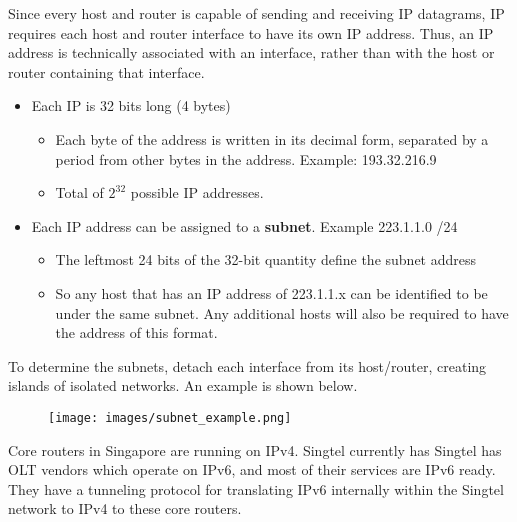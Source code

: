 \documentclass[a4paper]{article}
\begin{document}
\noindent Since every host and router is capable of sending and receiving IP datagrams, IP requires each host and router interface to have its own IP address. Thus, an IP address is technically associated with an interface, rather than with the host or router containing that interface.
\begin{itemize}
    \item Each IP is 32 bits long (4 bytes)
    \begin{itemize}[label=$\circ$]
        \item Each byte of the address is written in its decimal form, separated by a period from other bytes in the address. Example: 193.32.216.9
        \item Total of $2^{32}$ possible IP addresses.
    \end{itemize}
    \item Each IP address can be assigned to a \textbf{subnet}. Example 223.1.1.0 /24
    \begin{itemize}[label=$\circ$]
        \item The leftmost 24 bits of the 32-bit quantity define the subnet address
        \item So any host that has an IP address of 223.1.1.x can be identified to be under the same subnet. Any additional hosts will also be required to have the address of this format.
    \end{itemize}
\end{itemize}
To determine the subnets, detach each interface from its host/router, creating islands of isolated networks. An example is shown below.
\begin{figure}[H]
    \centering
    \texttt{[image: images/subnet\_example.png]}
\end{figure}
\begin{framed}
    \begin{displayquote}
        Core routers in Singapore are running on IPv4. Singtel currently has Singtel has OLT vendors which operate on IPv6, and most of their services are IPv6 ready. They have a tunneling protocol for translating IPv6 internally within the Singtel network to IPv4 to these core routers.
    \end{displayquote}
\end{framed}

\newpage
\end{document}
